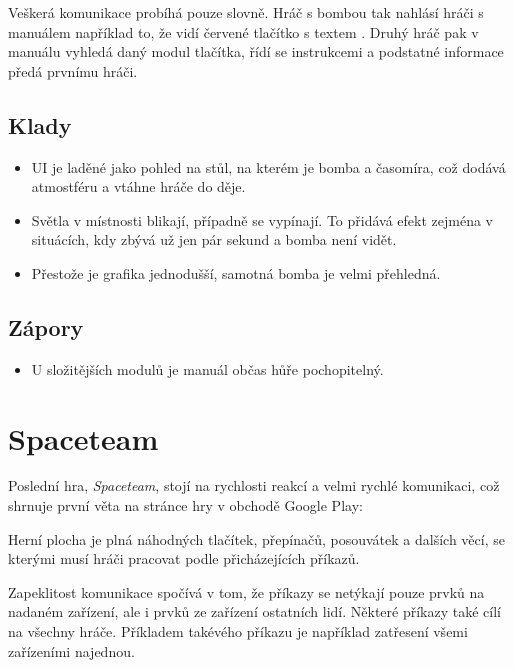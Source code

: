 Veškerá komunikace probíhá pouze slovně.
Hráč s bombou tak nahlásí hráči s manuálem například to,
že vidí červené tlačítko s textem .
Druhý hráč pak v manuálu vyhledá daný modul tlačítka, řídí se instrukcemi a
podstatné informace předá prvnímu hráči.

\FloatBarrier

\subsection*{Klady}

\begin{itemize}
    \item UI je laděné jako pohled na stůl, na kterém je bomba a časomíra,
což dodává atmostféru a vtáhne hráče do děje.
    \item Světla v místnosti blikají, případně se vypínají.
To přidává efekt zejména v situácích,
kdy zbývá už jen pár sekund a bomba není vidět.
    \item Přestože je grafika jednodušší, samotná bomba je velmi přehledná.
\end{itemize}

\subsection*{Zápory}

\begin{itemize}
    \item U složitějších modulů je manuál občas hůře pochopitelný.
\end{itemize}

\section{Spaceteam}

Poslední hra, \emph{Spaceteam}, stojí na rychlosti reakcí a velmi rychlé
komunikaci, což shrnuje první věta na stránce hry \cite{henrysmithinc_spaceteam}
v obchodě Google Play: 

Herní plocha je plná náhodných tlačítek, přepínačů, posouvátek a dalších věcí,
se kterými musí hráči pracovat podle přicházejících příkazů.

Zapeklitost komunikace spočívá v tom,
že příkazy se netýkají pouze prvků na nadaném zařízení,
ale i prvků ze zařízení ostatních lidí.
Některé příkazy také cílí na všechny hráče.
Příkladem takévého příkazu je například zatřesení všemi zařízeními najednou.

